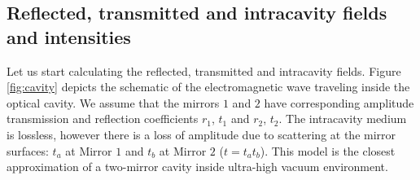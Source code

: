 \documentclass{article}
\numberwithin{equation}{section}
\begin{document}
\subsection{Reflected, transmitted and intracavity fields and intensities}

Let us start calculating the reflected, transmitted and intracavity fields. Figure \ref{fig:cavity} depicts the schematic of the electromagnetic wave traveling inside the optical cavity. We assume that the mirrors $1$ and $2$ have corresponding amplitude transmission and reflection coefficients $r_1$, $t_1$ and $r_2$, $t_2$. The intracavity medium is lossless, however there is a loss of amplitude due to scattering at the mirror surfaces: $t_a$ at Mirror $1$ and $t_b$ at Mirror $2$ ($t = t_a t_b$). This model is the closest approximation of a two-mirror cavity inside ultra-high vacuum environment.
\end{document}
